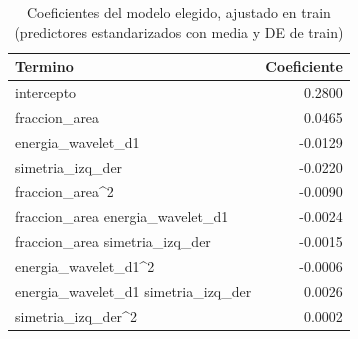 \begin{table}[H]
\centering
\small
\caption{Coeficientes del modelo elegido, ajustado en train (predictores estandarizados con media y DE de train)}
\begin{tabular}{lr}
\toprule
\textbf{Termino} & \textbf{Coeficiente} \\
\midrule
intercepto & 0.2800 \\
fraccion\_area & 0.0465 \\
energia\_wavelet\_d1 & -0.0129 \\
simetria\_izq\_der & -0.0220 \\
fraccion\_area\textasciicircum 2 & -0.0090 \\
fraccion\_area energia\_wavelet\_d1 & -0.0024 \\
fraccion\_area simetria\_izq\_der & -0.0015 \\
energia\_wavelet\_d1\textasciicircum 2 & -0.0006 \\
energia\_wavelet\_d1 simetria\_izq\_der & 0.0026 \\
simetria\_izq\_der\textasciicircum 2 & 0.0002 \\
\bottomrule
\end{tabular}
\end{table}
